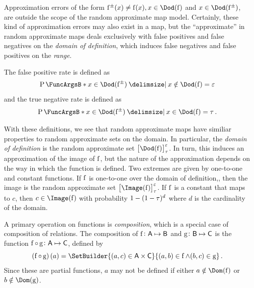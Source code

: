 \documentclass[11pt,final,hidelinks]{article}
\begin{document}
\begin{remark}
	Approximation errors of the form $\APFun{f}(x) \neq \PFun{f}(x),x\in \Dod(\operatorname{f})$ and $x \in \Dod(\APFun{f})$, are outside the scope of the random approximate map model.
	Certainly, these kind of approximation errors may also exist in a map, but the ``approximate'' in random approximate maps deals exclusively with false positives and false negatives on the \emph{domain of definition}, which induces false negatives and false positives on the \emph{range}.
\end{remark}

The false positive rate is defined as
\begin{equation}
\Prob{x \in \Dod(\APFun{f}) \Given x \notin \Dod(\PFun{f})} = \fprate
\end{equation}
and the true negative rate is defined as
\begin{equation}
\Prob{x \in \Dod(\APFun{f}) \Given x \in \Dod(\PFun{f})} = \tprate\,.
\end{equation}

With these definitions, we see that random approximate maps have similiar properties to random approximate sets on the domain.
In particular, the \emph{domain of definition} is the random approximate set $\ASetStyle{\left[\Dod(\PFun{f})\right]}[\tprate][\fprate]$.
In turn, this induces an approximation of the image of $\PFun{f}$, but the nature of the approximation depends on the way in which the function is defined.
Two extremes are given by one-to-one and constant functions.
If $\PFun{f}$ is one-to-one over the domain of definition,, then the image is the random approximate set $\ASetStyle{\left[\Image(\PFun{f})\right]}[\tprate][\fprate]$.
If $\PFun{f}$ is a constant that maps to $c$, then $c \in \Image(\PFun{f})$ with probability $1 - (1 - \tau)^d$ where $d$ is the cardinality of the domain.

A primary operation on functions is \emph{composition}, which is a special case of composition of relations.
The composition of $\PFun{f} \colon \Set{A} \mapsto \Set{B}$ and $\PFun{g} \colon \Set{B} \mapsto \Set{C}$ is the function $\PFun{f} \circ \PFun{g} \colon \Set{A} \mapsto \Set{C}$, defined by
\begin{equation}
\left(\PFun{f} \circ \PFun{g}\right)(a) = \SetBuilder{(a,c) \in \Set{A} \times \Set{C}}{(a,b) \in \PFun{f} \land (b,c) \in \PFun{g}}\,.
\end{equation}
Since these are partial functions, $a$ may not be defined if either $a \notin \Dom(\PFun{f})$ or $b \notin \Dom(\PFun{g})$.
\end{document}
